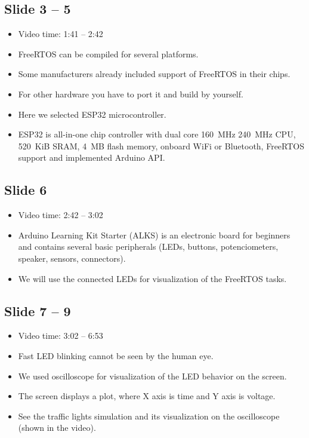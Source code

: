 \documentclass[12pt, a4paper]{article}
\begin{document}
	\subsection{Slide 3 -- 5}
	\begin{itemize}
		\item Video time: 1:41 -- 2:42
		\item FreeRTOS can be compiled for several platforms.
		\item Some manufacturers already included support of FreeRTOS in their chips.
		\item For other hardware you have to port it and build by yourself.
		\item Here we selected ESP32 microcontroller.
		\item ESP32 is all-in-one chip controller with dual core \SI{160}{MHz} \SI{240}{MHz} CPU, \SI{520}{KiB} SRAM, \SI{4}{MB} flash memory, onboard WiFi or Bluetooth, FreeRTOS support and implemented Arduino API.
	\end{itemize}

	\subsection{Slide 6}
	\begin{itemize}
		\item Video time: 2:42 -- 3:02
		\item Arduino Learning Kit Starter (ALKS) is an electronic board for beginners and contains several basic peripherals (LEDs, buttons, potenciometers, speaker, sensors, connectors).
		\item We will use the connected LEDs for visualization of the FreeRTOS tasks.
	\end{itemize}

	\subsection{Slide 7 -- 9}
	\begin{itemize}
		\item Video time: 3:02 -- 6:53
		\item Fast LED blinking cannot be seen by the human eye.
		\item We used oscilloscope for visualization of the LED behavior on the screen.
		\item The screen displays a plot, where X axis is time and Y axis is voltage.
		\item See the traffic lights simulation and its visualization on the oscilloscope (shown in the video).
	\end{itemize}
\end{document}
